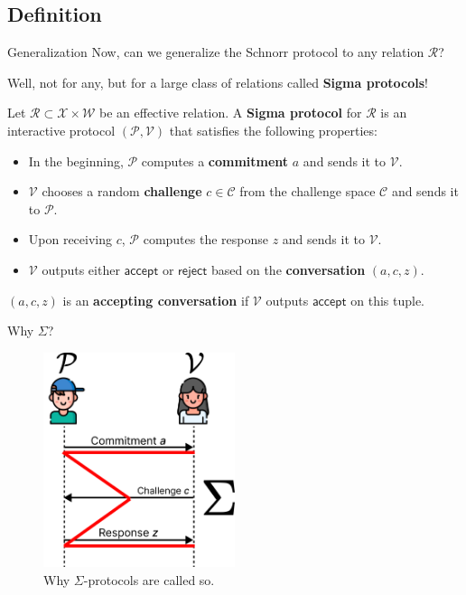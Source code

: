 \documentclass[xcolor={usenames,dvipsnames}]{beamer}
\begin{document}
    \subsection{Definition}
    \begin{frame}{Generalization}
        Now, can we generalize the Schnorr protocol to any relation $\mathcal{R}$?

        Well, not for any, but for a large class of relations called \textbf{Sigma protocols}!

        \begin{definition}
            Let $\mathcal{R} \subset \mathcal{X} \times \mathcal{W}$ be an effective relation. A \textbf{Sigma protocol} for $\mathcal{R}$ is an interactive protocol $(\mathcal{P}, \mathcal{V})$ that satisfies the following properties:
            \begin{itemize}
                \item In the beginning, $\mathcal{P}$ computes a \textbf{commitment} $a$ and sends it to $\mathcal{V}$.
                \item $\mathcal{V}$ chooses a random \textbf{challenge} $c \in \mathcal{C}$ from the challenge space $\mathcal{C}$ and sends it to $\mathcal{P}$.
                \item Upon receiving $c$, $\mathcal{P}$ computes the response $z$ and sends it to $\mathcal{V}$.
                \item $\mathcal{V}$ outputs either $\mathsf{accept}$ or $\mathsf{reject}$ based on the \textbf{conversation} $(a,c,z)$.
            \end{itemize}
        \end{definition}

        \begin{definition}
            $(a,c,z)$ is an \textbf{accepting conversation} if $\mathcal{V}$ outputs $\mathsf{accept}$ on this tuple.
        \end{definition}
    \end{frame}

    \begin{frame}{Why $\Sigma$?}
        \begin{figure}
        \centering
            \includegraphics[width=0.5\textwidth]{images/lecture_7/sigma_protocol_illustration.pdf}
            \caption{Why $\Sigma$-protocols are called so.}
        \end{figure}
    \end{frame}
\end{document}
